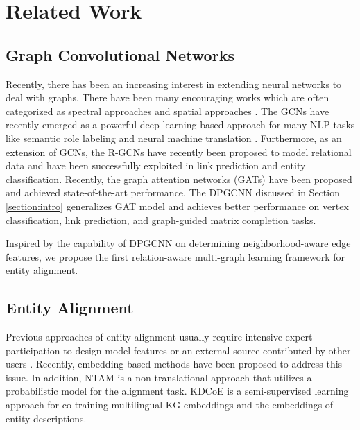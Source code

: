 \documentclass{article}
\begin{document}
\section{Related Work}
\subsection{Graph Convolutional Networks}
Recently, there has been an increasing interest in extending neural networks to deal with graphs. There have been many encouraging works which are often categorized as spectral approaches \cite{bruna2014spectral,cnn_graph,Kipf2016Semi} and spatial approaches \cite{atwood2016diffusion,hamilton2017inductive,velickovic2018graph}. The GCNs \cite{Kipf2016Semi} have recently emerged as a powerful deep learning-based approach for many NLP tasks like semantic role labeling \cite{Marcheggiani2017Encoding} and neural machine translation \cite{Bastings2017Graph}. Furthermore, as an extension of GCNs, the R-GCNs \cite{schlichtkrull2018modeling} have recently been proposed to model relational data and have been successfully exploited in link prediction and entity classification. Recently, the graph attention networks (GATs) \cite{velickovic2018graph} have been proposed and achieved state-of-the-art performance. The DPGCNN \cite{monti2018dual} discussed in Section \ref{section:intro} generalizes GAT model and achieves better performance on vertex classification, link prediction, and graph-guided matrix completion tasks.


Inspired by the capability of DPGCNN on determining neighborhood-aware edge features, we propose the first relation-aware multi-graph
learning framework for entity alignment.


\subsection{Entity Alignment} 
Previous approaches of entity alignment usually require intensive expert participation \cite{crowd2012} to design model features \cite{mahdisoltani2013yago3} or an external source contributed by other users \cite{Wang2017}.
Recently, embedding-based
methods \cite{hao2016joint,chen2016multilingual,sun2017cross,zhu2017iterative,sun2018bootstrapping,wang2018cross} have been proposed to address
this issue. In addition, NTAM \cite{conf/ijcai/LiLYWSO18} is a non-translational approach that utilizes a probabilistic model for the alignment
task. KDCoE \cite{chen2018co} is a semi-supervised learning approach for co-training multilingual KG embeddings and the embeddings of entity descriptions.
\end{document}
